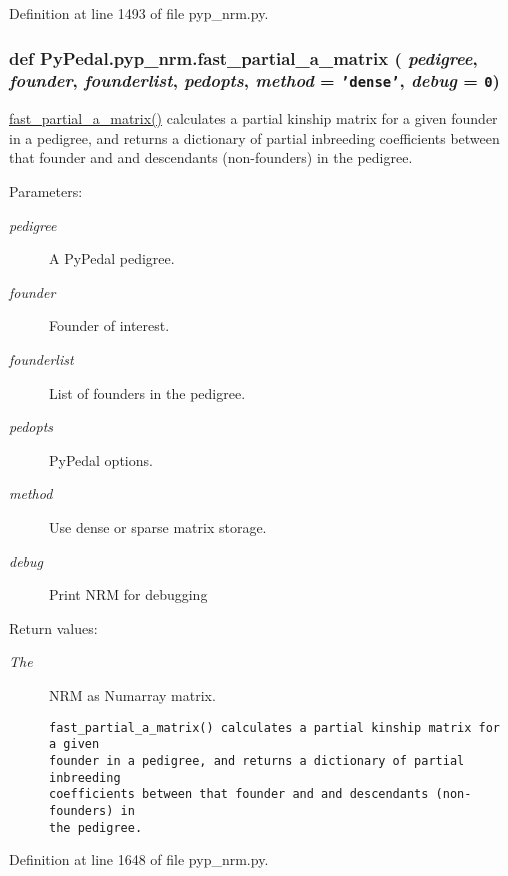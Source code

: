 Definition at line 1493 of file pyp\_\-nrm.py.\hypertarget{namespacePyPedal_1_1pyp__nrm_aeaadca15ddc3430d7b46cde3470e808}{
\subsubsection[fast\_\-partial\_\-a\_\-matrix]{\setlength{\rightskip}{0pt plus 5cm}def Py\-Pedal.pyp\_\-nrm.fast\_\-partial\_\-a\_\-matrix ( {\em pedigree},  {\em founder},  {\em founderlist},  {\em pedopts},  {\em method} = {\tt 'dense'},  {\em debug} = {\tt 0})}}
\label{namespacePyPedal_1_1pyp__nrm_aeaadca15ddc3430d7b46cde3470e808}


\hyperlink{namespacePyPedal_1_1pyp__nrm_aeaadca15ddc3430d7b46cde3470e808}{fast\_\-partial\_\-a\_\-matrix()} calculates a partial kinship matrix for a given founder in a pedigree, and returns a dictionary of partial inbreeding coefficients between that founder and and descendants (non-founders) in the pedigree. 

\begin{Desc}
\item[Parameters:]
\begin{description}
\item[{\em pedigree}]A Py\-Pedal pedigree. \item[{\em founder}]Founder of interest. \item[{\em founderlist}]List of founders in the pedigree. \item[{\em pedopts}]Py\-Pedal options. \item[{\em method}]Use dense or sparse matrix storage. \item[{\em debug}]Print NRM for debugging \end{description}
\end{Desc}
\begin{Desc}
\item[Return values:]
\begin{description}
\item[{\em The}]NRM as Numarray matrix.

\footnotesize\begin{verbatim}fast_partial_a_matrix() calculates a partial kinship matrix for a given
founder in a pedigree, and returns a dictionary of partial inbreeding
coefficients between that founder and and descendants (non-founders) in
the pedigree.
\end{verbatim}
\normalsize
 \end{description}
\end{Desc}


Definition at line 1648 of file pyp\_\-nrm.py.